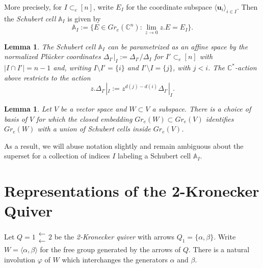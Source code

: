 \documentclass{amsart}
\newtheorem{lemma}[theorem]{Lemma}
\numberwithin{equation}{section}
\renewcommand{\AA}{\mathbb{A}}
\newcommand{\CC}{\mathbb{C}}
\newcommand{\bfu}{\mathbf{u}}
\begin{document}
  More precisely, for $I \subset_e [n]$, write $E_I$ for the coordinate subspace $\langle \bfu_i \rangle_{i \in I}$.
  Then the \emph{Schubert cell} $\AA_I$ is given by
  \[\AA_I:=\{E\in Gr_e(\CC^n):\lim_{z\to0} z.E=E_I\}.\]
  \begin{lemma}
    The Schubert cell $\AA_I$ can be parametrized as an affine space by the normalized Pl\"ucker coordinates $\Delta_{I'}|_I:=\Delta_{I'}/\Delta_I$ for $I' \subset_e [n]$ with $|I\cap I'|=n-1$ and, writing $I\setminus I'=\{i\}$ and $I'\setminus I=\{j\}$, with $j<i$.
    The $\CC^*$-action above restricts to the action 
    \[z.\Delta_{I'}|_I:=z^{d(j)-d(i)} \Delta_{I'}|_I.\]
  \end{lemma}
  
  \begin{lemma}
    Let $V$ be a vector space and $W\subset V$ a subspace.
    There is a choice of basis of $V$ for which the closed embedding $Gr_e(W)\subset Gr_e(V)$ identifies $Gr_e(W)$ with a union of Schubert cells inside $Gr_e(V)$.
  \end{lemma}
  As a result, we will abuse notation slightly and remain ambiguous about the superset for a collection of indices $I$ labeling a Schubert cell $\AA_I$.

\section{Representations of the 2-Kronecker Quiver}

  Let $Q=1\substack{\longleftarrow\\\longleftarrow} 2$ be the \emph{2-Kronecker quiver} with arrows $Q_1=\{\alpha,\beta\}$.
  Write $W=\langle\alpha,\beta\rangle$ for the free group generated by the arrows of $Q$.
  There is a natural involution $\varphi$ of $W$ which interchanges the generators $\alpha$ and $\beta$.
\end{document}
